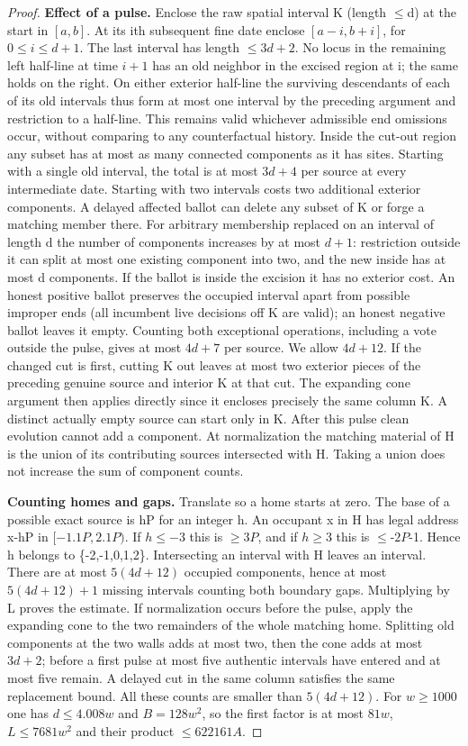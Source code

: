 \begin{proof}
\textbf{Effect of a pulse.} Enclose the raw spatial interval K (length \(\le\)d) at the start in \([a,b]\). At its ith subsequent fine date enclose \([a-i,b+i]\), for \(0\le i\le d+1\). The last interval has length \(\le\)\(3d+2\). No locus in the remaining left half-line at time \(i+1\) has an old neighbor in the excised region at i; the same holds on the right. On either exterior half-line the surviving descendants of each of its old intervals thus form at most one interval by the preceding argument and restriction to a half-line. This remains valid whichever admissible end omissions occur, without comparing to any counterfactual history. Inside the cut-out region any subset has at most as many connected components as it has sites. Starting with a single old interval, the total is at most \(3d+4\) per source at every intermediate date. Starting with two intervals costs two additional exterior components. A delayed affected ballot can delete any subset of K or forge a matching member there. For arbitrary membership replaced on an interval of length d the number of components increases by at most \(d+1\): restriction outside it can split at most one existing component into two, and the new inside has at most d components. If the ballot is inside the excision it has no exterior cost. An honest positive ballot preserves the occupied interval apart from possible improper ends (all incumbent live decisions off K are valid); an honest negative ballot leaves it empty. Counting both exceptional operations, including a vote outside the pulse, gives at most \(4d+7\) per source. We allow \(4d+12\). If the changed cut is first, cutting K out leaves at most two exterior pieces of the preceding genuine source and interior K at that cut. The expanding cone argument then applies directly since it encloses precisely the same column K. A distinct actually empty source can start only in K. After this pulse clean evolution cannot add a component. At normalization the matching material of H is the union of its contributing sources intersected with H. Taking a union does not increase the sum of component counts.

\textbf{Counting homes and gaps.} Translate so a home starts at zero. The base of a possible exact source is hP for an integer h. An occupant x in H has legal address x-hP in \([-1.1P,2.1P)\). If \(h\le -3\) this is \(\ge\)\(3P\), and if \(h\ge 3\) this is \(\le\)-\(2P\)-1. Hence h belongs to \{-2,-1,0,1,2\}. Intersecting an interval with H leaves an interval. There are at most \(5(4d+12)\) occupied components, hence at most \(5(4d+12)+1\) missing intervals counting both boundary gaps. Multiplying by L proves the estimate. If normalization occurs before the pulse, apply the expanding cone to the two remainders of the whole matching home. Splitting old components at the two walls adds at most two, then the cone adds at most \(3d+2\); before a first pulse at most five authentic intervals have entered and at most five remain. A delayed cut in the same column satisfies the same replacement bound. All these counts are smaller than \(5(4d+12)\). For \(w\ge 1000\) one has \(d\le 4.008w\) and \(B=128w^2\), so the first factor is at most \(81w\), \(L\le 7681w^2\) and their product \(\le\)\(622161A\).


\end{proof}
